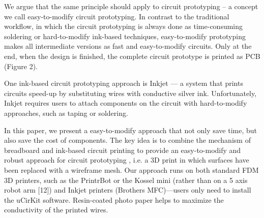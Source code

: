We argue that the same principle should apply to circuit prototyping – a concept we call easy-to-modify circuit prototyping. In contrast to the traditional workflow, in which the circuit prototyping is always done as time-consuming soldering or hard-to-modify ink-based techniques, easy-to-modify prototyping makes all intermediate versions as fast and easy-to-modify circuits. Only at the end, when the design is finished, the complete circuit prototype is printed as PCB (Figure 2).

One ink-based circuit prototyping approach is Inkjet — a system that prints circuits speed-up by substituting wires with conductive silver ink. Unfortunately, Inkjet requires users to attach components on the circuit with hard-to-modify approaches, such as taping or soldering.

In this paper, we present a easy-to-modify approach that not only save time, but also save the cost of components. The key idea is to combine the mechanism of breadboard and ink-based circuit printing to provide an easy-to-modify and robust approach for circuit prototyping , i.e. a 3D print in which surfaces have been replaced with a wireframe mesh. Our approach runs on both standard FDM 3D printers, such as the PrintrBot or the Kossel mini (rather than on a 5 axis robot arm [12]) and Inkjet printers (Brothers MFC)—users only need to install the uCirKit software. Resin-coated photo paper helps to maximize the conductivity of the printed wires.
